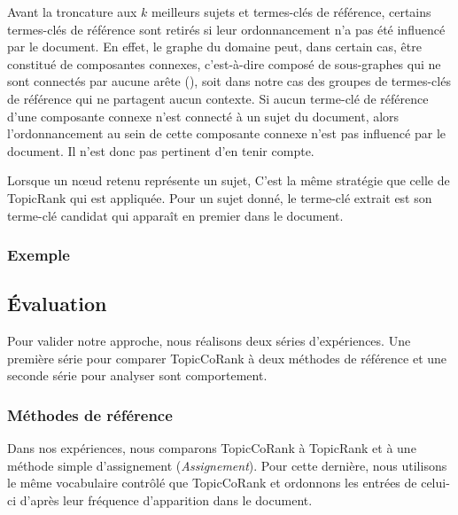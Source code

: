        Avant la troncature aux $k$ meilleurs sujets et termes-clés de
        référence, certains termes-clés de référence sont retirés si leur
        ordonnancement n'a pas été influencé par le document. En effet, le
        graphe du domaine peut, dans certain cas, être constitué de composantes
        connexes, c'est-à-dire composé de sous-graphes qui ne sont connectés par
        aucune arête (), soit dans notre cas des groupes de
        termes-clés de référence qui ne partagent aucun contexte. Si aucun
        terme-clé de référence d'une composante connexe n'est connecté à un
        sujet du document, alors l'ordonnancement au sein de cette composante
        connexe n'est pas influencé par le document. Il n'est donc pas pertinent
        d'en tenir compte.

        Lorsque un n\oe{}ud retenu représente un sujet, C'est la même stratégie
        que celle de TopicRank qui est appliquée. Pour un sujet donné, le
        terme-clé extrait est son terme-clé candidat qui apparaît en premier
        dans le document.

      \subsubsection{Exemple}
      \label{subsubsec:main-domain_specific_keyphrase_annotation-supervised_automatic_keyphrase_extraction-topiccorank-exemple}
        \TODO{\dots}

    \subsection{Évaluation}
    \label{subsec:main-domain_specific_keyphrase_annotation-supervised_automatic_keyphrase_annotation-evaluation}
      Pour valider notre approche, nous réalisons deux séries d'expériences. Une
      première série pour comparer TopicCoRank à deux méthodes de référence et
      une seconde série pour analyser sont comportement.

      \subsubsection{Méthodes de référence}
      \label{subsubsec:main-domain_specific_keyphrase_annotation-supervised_automatic_keyphrase_annotation-evaluation-baselines}
        Dans nos expériences, nous comparons TopicCoRank à TopicRank et à
        une méthode simple d'assignement (\textit{Assignement}). Pour cette
        dernière, nous utilisons le même vocabulaire contrôlé que TopicCoRank et
        ordonnons les entrées de celui-ci d'après leur fréquence d'apparition
        dans le document. 

